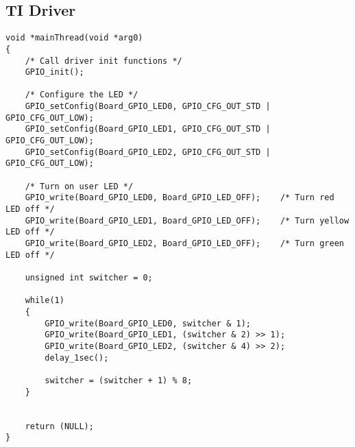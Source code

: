 \newpage
\subsection{TI Driver}

\begin{lstlisting}[style=CStyle, caption={Toggling LEDs according to Table \ref{tab:led_scheme} using TI Driver}, captionpos=b, label={lst:led_ti}, escapechar=@]
void *mainThread(void *arg0)
{
    /* Call driver init functions */
    GPIO_init();
 
    /* Configure the LED */
    GPIO_setConfig(Board_GPIO_LED0, GPIO_CFG_OUT_STD | GPIO_CFG_OUT_LOW);
    GPIO_setConfig(Board_GPIO_LED1, GPIO_CFG_OUT_STD | GPIO_CFG_OUT_LOW);
    GPIO_setConfig(Board_GPIO_LED2, GPIO_CFG_OUT_STD | GPIO_CFG_OUT_LOW);
 
    /* Turn on user LED */
    GPIO_write(Board_GPIO_LED0, Board_GPIO_LED_OFF);    /* Turn red LED off */
    GPIO_write(Board_GPIO_LED1, Board_GPIO_LED_OFF);    /* Turn yellow LED off */
    GPIO_write(Board_GPIO_LED2, Board_GPIO_LED_OFF);    /* Turn green LED off */
 
    unsigned int switcher = 0;
 
    while(1)
    {
        GPIO_write(Board_GPIO_LED0, switcher & 1);
        GPIO_write(Board_GPIO_LED1, (switcher & 2) >> 1);
        GPIO_write(Board_GPIO_LED2, (switcher & 4) >> 2);
        delay_1sec();
 
        switcher = (switcher + 1) % 8;
    }
 
 
    return (NULL);
}
\end{lstlisting}

